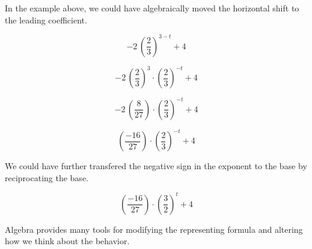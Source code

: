 \documentclass{ximera}
\begin{document}
In the example above, we could have algebraically moved the horizontal shift to the leading coefficient.



\[
-2 \, \left( \frac{2}{3} \right)^{3-t} + 4
\]


\[
-2 \, \left( \frac{2}{3} \right)^{3} \cdot \left( \frac{2}{3} \right)^{-t}+ 4
\]


\[
-2 \, \left( \frac{8}{27} \right)  \cdot \left( \frac{2}{3} \right)^{-t}+ 4
\]


\[
\left( \frac{-16}{27} \right)  \cdot \left( \frac{2}{3} \right)^{-t}+ 4
\]


We could have further transfered the negative sign in the exponent to the base by reciprocating the base.

\[
\left( \frac{-16}{27} \right)  \cdot \left( \frac{3}{2} \right)^t+ 4
\]



Algebra provides many tools for modifying the representing formula and altering how we think about the behavior. 
\end{document}
